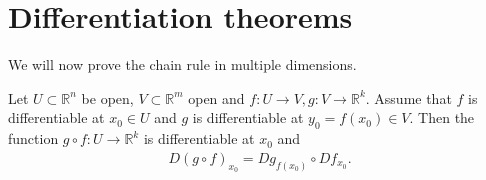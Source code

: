 \section{Differentiation theorems}

We will now prove the chain rule in multiple dimensions.

\begin{theorem}\label{thm:chain-rule}
	Let $U \subset \mathbb{R}^{n}$ be open, $V \subset \mathbb{R}^{m}$ open and $f: U \to V, g: V \to \mathbb{R}^{k}$. Assume that $f$ is differentiable at $x_{0} \in U$ and $g$ is differentiable at $y_{0} = f(x_{0}) \in V$. Then the function $g \circ f: U \to \mathbb{R}^{k}$ is differentiable at $x_{0}$ and
	\begin{align*}
		D(g \circ f)_{x_{0}} = Dg_{f(x_{0})} \circ Df_{x_{0}}.
	\end{align*}
\end{theorem}


